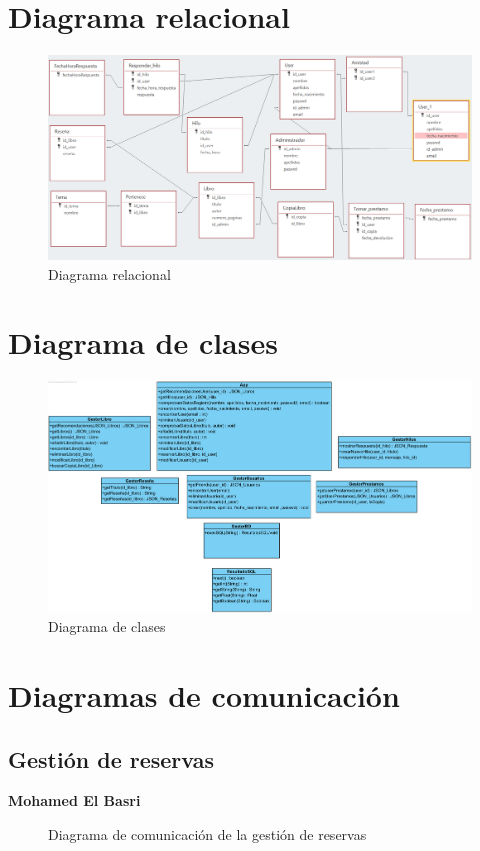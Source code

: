 ﻿\documentclass{report}
\begin{document}
    \chapter{Diagrama relacional}
        \begin{figure}[H]
            \centering
            \includegraphics[width=1.0\textwidth]{img/relacional/relacional.png}
            \caption{Diagrama relacional}
        \end{figure}
    \chapter{Diagrama de clases}
        \begin{figure}[H]
            \centering
            \includegraphics[width=1.0\textwidth]{img/clases/clases.png}
            \caption{Diagrama de clases}
        \end{figure}
    \chapter{Diagramas de comunicación}
        \section{Gestión de reservas}
            \textbf{Mohamed El Basri}
            \begin{figure}[H]
                \centering
                \caption{Diagrama de comunicación de la gestión de reservas}
            \end{figure}
            \clearpage
\end{document}
